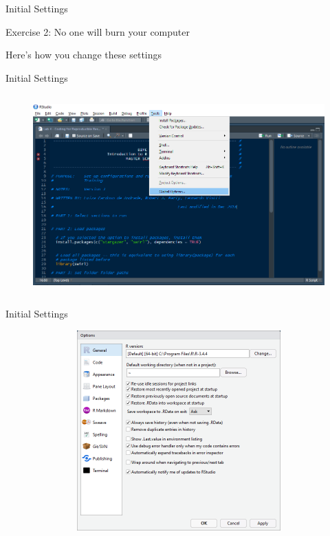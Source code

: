 \documentclass[ignorenonframetext,]{beamer}
\begin{document}
\begin{frame}{Initial Settings}

\begin{block}{Exercise 2: No one will burn your computer}

Here's how you change these settings

\end{block}

\end{frame}

\begin{frame}{Initial Settings}

\begin{figure}
\centering
  \includegraphics[width=12cm,height=7.7cm]{img/Options1.png}
\end{figure}

\end{frame}

\begin{frame}{Initial Settings}

\begin{figure}
\centering
  \includegraphics[width=12cm,height=7.7cm]{img/Options2.png}
\end{figure}

\end{frame}
\end{document}
